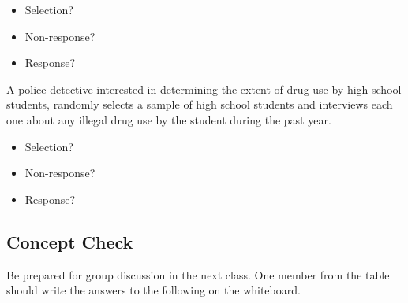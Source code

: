 \documentclass[
]{report}
\providecommand{\tightlist}{%
  \setlength{\itemsep}{0pt}\setlength{\parskip}{0pt}}
\begin{document}
\begin{itemize}
\tightlist
\item
  Selection?
\end{itemize}

\vspace{0.25in}

\begin{itemize}
\tightlist
\item
  Non-response?
\end{itemize}

\vspace{0.25in}

\begin{itemize}
\tightlist
\item
  Response?
\end{itemize}

\vspace{0.25in}

A police detective interested in determining the extent of drug use by high school students, randomly selects a sample of high school students and interviews each one about any illegal drug use by the student during the past year.

\begin{itemize}
\tightlist
\item
  Selection?
\end{itemize}

\vspace{0.25in}

\begin{itemize}
\tightlist
\item
  Non-response?
\end{itemize}

\vspace{0.25in}

\begin{itemize}
\tightlist
\item
  Response?
\end{itemize}

\vspace{0.25in}

\subsection{Concept Check}\label{concept-check}

Be prepared for group discussion in the next class. One member from the table should write the answers to the following on the whiteboard.
\end{document}
